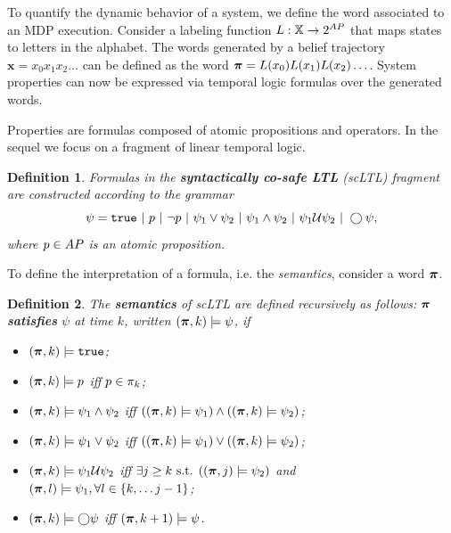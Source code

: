 \documentclass[conference]{IEEEtran}
\newtheorem{definition}{Definition}
\begin{document}
To quantify the dynamic behavior of a system, we define the word associated to an MDP execution. Consider a labeling function $L: \mathbb{X} \rightarrow {2^{AP}}$ that maps states to letters in the alphabet. The words generated by a belief trajectory $\mathbf{x} = x_0 x_1 x_2 \ldots$ can be defined as the word $\boldsymbol{\pi} = L(x_0)L(x_1) L(x_2) \ldots$. System properties can now be expressed via temporal logic formulas over the generated words.

Properties are formulas composed of atomic propositions and operators. In the sequel we focus on a fragment of linear temporal logic. 
\begin{definition}
  \label{def:gdtl-syntax}
  Formulas in the \textbf{syntactically co-safe LTL} (scLTL) fragment are constructed according to the grammar
  \begin{equation*}
    \label{eq:scLTL}
    \psi =  \True \ |\ p \ |\ \lnot p \ |\ \psi_1 \vee\psi_2  \ |\ \psi_1 \land \psi_2 \ |\ \psi_1 \ltluntil \psi_2 \ |\ \ltlnext \psi,
  \end{equation*}
  where $p\in AP$ is an atomic proposition.
\end{definition}

To define the interpretation of a formula, i.e. the \emph{semantics}, consider a word $\boldsymbol{\pi}$.

\begin{definition}
 The \textbf{semantics} of scLTL are defined recursively as follows: $\boldsymbol{\pi}$ \textbf{satisfies} $\psi$ at time $k$, written $(\boldsymbol{\pi}, k) \models \psi$, if
 \begin{itemize}
    \item $(\boldsymbol{\pi}, k) \models \texttt{true}$;
    \item $(\boldsymbol{\pi}, k) \models p$ iff $p \in \pi_k$;
    \item $(\boldsymbol{\pi}, k) \models \psi_1 \land  \psi_2  $ iff $ ( (\boldsymbol{\pi}, k) \models \psi_1 ) \land ( (\boldsymbol{\pi}, k) \models \psi_2 ) $;
    \item $(\boldsymbol{\pi}, k) \models \psi_1 \lor  \psi_2  $ iff $ ( (\boldsymbol{\pi}, k) \models \psi_1 ) \lor ( (\boldsymbol{\pi}, k) \models \psi_2 ) $;
    \item $(\boldsymbol{\pi}, k) \models  \psi_1 \mathcal{U} \psi_2 $ iff $\exists j \geq k \text{ s.t. } ((\boldsymbol{\pi}, j) \models \psi_2 ) $ and $(\boldsymbol{\pi}, l) \models \psi_1, \forall l \in \{k, \ldots j-1\}$;
    \item $(\boldsymbol{\pi}, k) \models \bigcirc \psi$ iff $(\boldsymbol{\pi}, k+1) \models \psi$.
 \end{itemize}

\end{definition}
\end{document}
